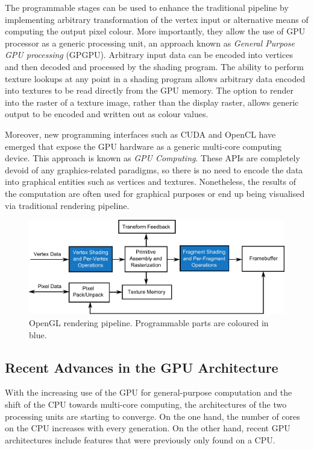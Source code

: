 \documentclass[11pt,a4paper,twoside]{article}
\begin{document}
The programmable stages can be used to enhance the traditional pipeline by implementing arbitrary transformation of the vertex input or alternative means of computing the output pixel colour. More importantly, they allow the use of GPU processor as a generic processing unit, an approach known as \emph{General Purpose GPU processing} (GPGPU). Arbitrary input data can be encoded into vertices and then decoded and processed by the shading program. The ability to perform texture lookups at any point in a shading program allows arbitrary data encoded into textures to be read directly from the GPU memory. The option to render into the raster of a texture image, rather than the display raster, allows generic output to be encoded and written out as colour values.

Moreover, new programming interfaces such as CUDA and OpenCL have emerged that expose the GPU hardware as a generic multi-core computing device. This approach is known as \emph{GPU Computing}. These APIs  are completely devoid of any graphics-related paradigms, so there is no need to encode the data into graphical entities such as vertices and textures. Nonetheless, the results of the computation are often used for graphical purposes or end up being visualised via traditional rendering pipeline.

\begin {figure}
	\centering
	\includegraphics [width=1.0\columnwidth]{figures/gl_pipeline}
	\caption {OpenGL rendering pipeline. Programmable parts are coloured in blue.}
	\label {fig:gl_pipeline}
\end {figure}

\subsection{Recent Advances in the GPU Architecture}
\label{sec:recent}

With the increasing use of the GPU for general-purpose computation and the shift of the CPU towards multi-core computing, the architectures of the two processing units are starting to converge. On the one hand, the number of cores on the CPU increases with every generation. On the other hand, recent GPU architectures include features that were previously only found on a CPU.
\end{document}
